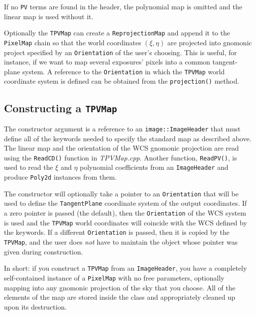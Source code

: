 \documentclass[11pt,preprint,flushrt]{aastex}
\begin{document}
If no {\tt PV} terms are found in the header, the polynomial map is omitted and the linear map is used without it.

Optionally the {\tt TPVMap} can create a {\tt ReprojectionMap} and append it to the {\tt PixelMap} chain so that the world coordinates $(\xi,\eta)$ are projected into gnomonic project specified by an {\tt Orientation} of the user's choosing.  This is useful, for instance, if we want to map several exposures' pixels into a common tangent-plane system.  A reference to the {\tt Orientation} in which the {\tt TPVMap} world coordinate system is defined can be obtained from the {\tt projection()} method.

\subsection{Constructing a {\tt TPVMap}}
The constructor argument is a reference to an {\tt image::ImageHeader} that must define all of the keywords needed to specify the standard map as described above.  The linear map and the orientation of the WCS gnomonic projection are read using the {\tt ReadCD()} function in {\it TPVMap.cpp}.  Another function, {\tt ReadPV()}, is used to read the $\xi$ and $\eta$ polynomial coefficients from an {\tt ImageHeader} and produce {\tt Poly2d} instances from them.

The constructor will optionally take a pointer to an {\tt Orientation} that will be used to define the {\tt TangentPlane} coordinate system of the output coordinates.  If a zero pointer is passed (the default), then the {\tt Orientation} of the WCS system is used and the {\tt TPVMap} world coordinates will coincide with the WCS defined by the keywords.  If a different {\tt Orientation} is passed, then it is copied by the {\tt TPVMap}, and the user does {\em not} have to maintain the object whose pointer was given during construction.

In short: if you construct a {\tt TPVMap} from an {\tt ImageHeader}, you have a completely self-contained instance of a {\tt PixelMap} with no free parameters, optionally mapping into any gnomonic projection of the sky that you choose.  All of the elements of the map are stored inside the class and appropriately cleaned up upon its destruction.
\end{document}
